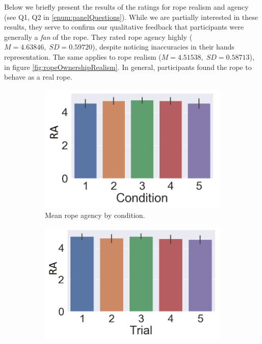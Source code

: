 Below we briefly present the results of the ratings for rope realism and agency (see Q1, Q2 in \ref{enum:panelQuestions}). While we are partially interested in these results, they serve to confirm our qualitative feedback that participants were generally a \textit{fan} of the rope. They rated rope agency highly 
($M=4.63846, \; SD=0.59720$), despite noticing inaccuracies in their hands representation. The same applies to rope realism ($M=4.51538, \; SD=0.58713$), in figure \ref{fig:ropeOwnershipRealism}. In general, participants found the rope to behave as a real rope.

\begin{figure}[H]
 \begin{subfigure}[b]{0.3\textwidth}
     \centering
     \includegraphics[scale=0.3]{Files/Plots/rocond.png}
     \caption{Mean rope agency by condition.}
     \label{fig:ropeOwnCond}
 \end{subfigure}
  \begin{subfigure}[b]{0.3\textwidth}
     \centering
     \includegraphics[scale=0.3]{Files/Plots/rotrial.png}

\end{subfigure}
\end{figure}

